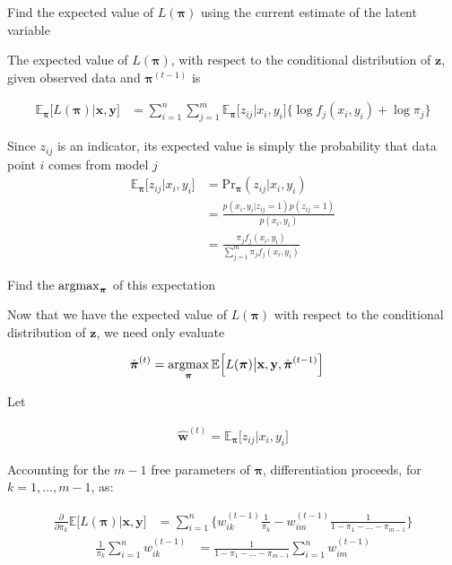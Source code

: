 \documentclass{beamer}
\newcommand{\eqn}[1]{\begin{align*}
#1
\end{align*}}
\newcommand{\vect}[1]{\boldsymbol{\mathbf{#1}}}
\newcommand{\bl}{\big\{}
\newcommand{\br}{\big\}}
\newcommand{\Bl}{\Big\{}
\newcommand{\Br}{\Big\}}
\newcommand{\argmax}{\operatornamewithlimits{argmax}}
\newcommand{\vx}{\vect{x}}
\newcommand{\vy}{\vect{y}}
\newcommand{\vp}{\vect{\pi}}
\newcommand{\vph}{\hat{\vect{\pi}}}
\newcommand{\sumn}{\sum^n_{i=1}}
\newcommand{\summ}{\sum^m_{j=1}}
\newcommand{\fab}{f_j}
\newcommand{\llp}{L(\vp)}
\begin{document}
\begin{frame}{Find the expected value of $L(\vect{\pi})$ using the current estimate of the latent variable}
	
	The expected value of $\llp$, with respect to the conditional distribution of $\vect{z}$, given observed data and $\vp^{(t-1)}$ is
	
	\eqn{
		\mathbb{E}_{\vp}\Big[\llp \big| \vx,\vy \Big] &= \sumn \summ \mathbb{E}_{\vp}\big[z_{ij}|x_i,y_i\big] \bl \log \fab(x_i,y_i) + \log \pi_j  \br
	}
	
	Since $z_{ij}$ is an indicator, its expected value is simply the probability that data point $i$ comes from model $j$
	\eqn{
		\mathbb{E}_{\vp}\Big[  z_{ij} | x_i, y_i \Big]	&= \text{Pr}_{\vp}(z_{ij}|x_i,y_i)	\\
										&= \frac{p(x_i,y_i|z_{ij}=1)p(z_{ij}=1)}{p(x_i,y_i)}	\\
										&=  \frac{\pi_j \fab(x_i,y_i)  }{\summ \pi_j \fab(x_i,y_i)}
	}
	
	
		
	
\end{frame}















\begin{frame}{Find the $\argmax_{\vp}$ of this expectation}
	
		
	Now that we have the expected value of $\llp$ with respect to the conditional distribution of $\vect{z}$, we need only evaluate
	
	
	\eqn{
		\vph^{(t)} &= \argmax_{\vp} \mathbb{E}\Big[\llp \big| \vx,\vy,\vph^{(t-1)} \Big]   
	}
	
	Let
	
	\eqn{
		\hat{\vect{w}}^{(t)} = \mathbb{E}_{\vp}\Big[  z_{ij} | x_i, y_i \Big]
	}
	
	Accounting for the $m-1$ free parameters of $\vp$, differentiation proceeds, for $k=1,\ldots,m-1$, as:
	
	\eqn{
		\frac{\partial}{\partial \pi_k} \mathbb{E}\Big[\llp \big| \vect{x},\vect{y}\Big]   &=      \sumn \Bl  w^{(t-1)}_{ik} \frac{1}{\pi_k} - w^{(t-1)}_{im} \frac{1}{1-\pi_1-\ldots-\pi_{m-1}}   \Br
	}
	\eqn{
		\frac{1}{\pi_k} \sumn w_{ik}^{(t-1)} &= \frac{1}{1-\pi_1-\ldots-\pi_{m-1}} \sumn w_{im}^{(t-1)}
	}
	
	
\end{frame}
\end{document}

